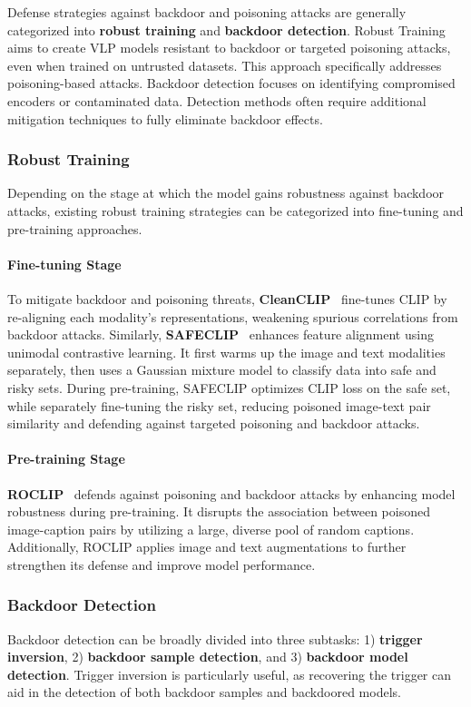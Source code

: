 Defense strategies against backdoor and poisoning attacks are generally categorized into \textbf{robust training} and \textbf{backdoor detection}. Robust Training aims to create VLP models resistant to backdoor or targeted poisoning attacks, even when trained on untrusted datasets. This approach specifically addresses poisoning-based attacks. Backdoor detection focuses on identifying compromised encoders or contaminated data. Detection methods often require additional mitigation techniques to fully eliminate backdoor effects.


\subsubsection{Robust Training}
Depending on the stage at which the model gains robustness against backdoor attacks, existing robust training strategies can be categorized into fine-tuning and pre-training approaches.

\paragraph{Fine-tuning Stage}
To mitigate backdoor and poisoning threats, \textbf{CleanCLIP}~\cite{bansal2023cleanclip} fine-tunes CLIP by re-aligning each modality's representations, weakening spurious correlations from backdoor attacks. Similarly, \textbf{SAFECLIP}~\cite{yang2023better} enhances feature alignment using unimodal contrastive learning. It first warms up the image and text modalities separately, then uses a Gaussian mixture model to classify data into safe and risky sets. During pre-training, SAFECLIP optimizes CLIP loss on the safe set, while separately fine-tuning the risky set, reducing poisoned image-text pair similarity and defending against targeted poisoning and backdoor attacks.

\paragraph{Pre-training Stage}
\textbf{ROCLIP}~\cite{yang2024robust} defends against poisoning and backdoor attacks by enhancing model robustness during pre-training. It disrupts the association between poisoned image-caption pairs by utilizing a large, diverse pool of random captions. Additionally, ROCLIP applies image and text augmentations to further strengthen its defense and improve model performance.


\subsubsection{Backdoor Detection}
Backdoor detection can be broadly divided into three subtasks: 1) \textbf{trigger inversion}, 2) \textbf{backdoor sample detection}, and 3) \textbf{backdoor model detection}. Trigger inversion is particularly useful, as recovering the trigger can aid in the detection of both backdoor samples and backdoored models.

